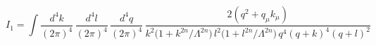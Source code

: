 \begin{equation}
I_1 =  \int \frac{d^4k}{(2\pi)^4}\,
\frac{d^4l}{(2\pi)^4}\,\frac{d^4q}{(2\pi)^4}\,
\frac{2 (q^2 +q_\mu k_\mu)}{k^2 \Big(1+k^{2n}/\Lambda^{2n}\Big)\,
l^2\Big(1+l^{2n}/\Lambda^{2n}\Big)\,q^4 (q+k)^4 (q+l)^2}
\end{equation}

